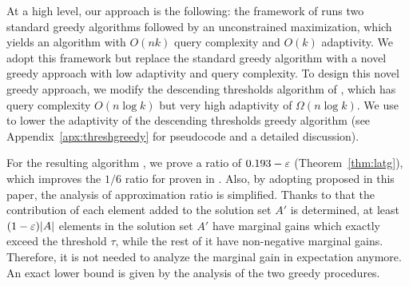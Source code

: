 At a high level, our approach is the following:
the \iter framework of 
runs two standard greedy algorithms followed by an
unconstrained maximization, which yields an algorithm
with $O(nk)$ query complexity and $O(k)$ adaptivity. 
We adopt this framework
but replace the standard greedy algorithm with a
novel greedy approach with low adaptivity and query complexity.
To design this novel greedy approach, we modify
the descending thresholds algorithm of ,
which has query complexity $O(n \log k)$ but very high adaptivity
of $\Omega(n \log k)$.
We use \threseq to lower the adaptivity of the descending thresholds 
greedy algorithm (see
Appendix~\ref{apx:threshgreedy} for pseudocode and a detailed discussion).

For the resulting algorithm \latg, 
we prove a ratio of %
$0.193 - \varepsilon$ (Theorem~\ref{thm:latg}), which
improves the $1/6$ ratio for \iter proven in .
Also, by adopting \threseq proposed in this paper,
the analysis of approximation ratio is simplified.
Thanks to that the contribution of each element added to the
solution set $A'$ is determined,
at least $(1-\varepsilon)|A|$ elements in the solution set $A'$ 
have marginal gains which exactly exceed the threshold $\tau$,
while the rest of it have non-negative marginal gains.
Therefore, it is not needed to analyze the marginal gain in expectation anymore.
An exact lower bound is given by the analysis of the two greedy procedures.


